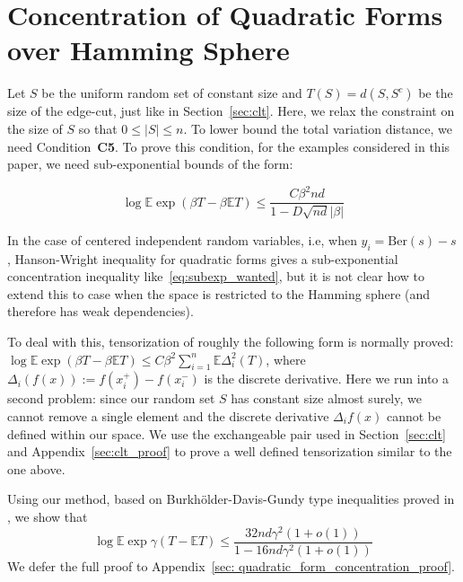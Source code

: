 \documentclass[final,12pt]{colt2018}
\begin{document}
 



\section{Concentration of Quadratic Forms over Hamming Sphere}
\label{sec:burkholder_subexp}
Let $S$ be the uniform random set of constant size and $T(S) = d(S,S^{c})$ be the size of the edge-cut, just like in Section~\ref{sec:clt}. Here, we relax the constraint on the size of $S$ so that $0 \leq |S| \leq n$. To lower bound the total variation distance, we need Condition~\textbf{C5}. To prove this condition, for the examples considered in this paper, we need sub-exponential bounds of the form:

\begin{equation}
\log{\mathbb{E}\exp{\left(\beta T - \beta \mathbb{E}T\right)}} \leq \frac{C\beta^2 nd}{1 - D\sqrt{nd}|\beta|}
\label{eq:subexp_wanted}
\end{equation}

 In the case of centered independent random variables, i.e, when $y_i = \mathrm{Ber}(s)-s$, Hanson-Wright inequality for quadratic forms gives a sub-exponential concentration inequality like~\eqref{eq:subexp_wanted}, but it is not clear how to extend this to case when the space is restricted to the Hamming sphere (and therefore has weak dependencies).

To deal with this, tensorization of roughly the following form is normally proved:
$
\log{\mathbb{E}\exp{\left(\beta T - \beta \mathbb{E}T\right)}} 
\leq C \beta^2 \sum_{i=1}^n \mathbb{E}\Delta_i^2(T)
$, 
where $\Delta_i (f(x)) := f(x_i^{+}) - f(x_i^{-})$ is the discrete derivative. Here we run into a second problem: since our random set $S$ has constant size almost surely, we cannot remove a single element and the discrete derivative $\Delta_i f(x)$ cannot be defined within our space. We use the exchangeable pair used in Section~\ref{sec:clt} and Appendix~\ref{sec:clt_proof} to prove a well defined tensorization similar to the one above.

Using our method, based on Burkh\"older-Davis-Gundy type inequalities proved in \citet{chatterjee2007stein}, we show that
\begin{equation}
\log{\mathbb{E}\exp{\gamma(T - \mathbb{E}T)}} \leq \frac{32nd\gamma^2(1+o(1))}{ 1 - 16nd\gamma^2(1+o(1))} 
\label{reverse_jensen}
\end{equation}
We defer the full proof to Appendix~\ref{sec: quadratic_form_concentration_proof}. 
\end{document}
